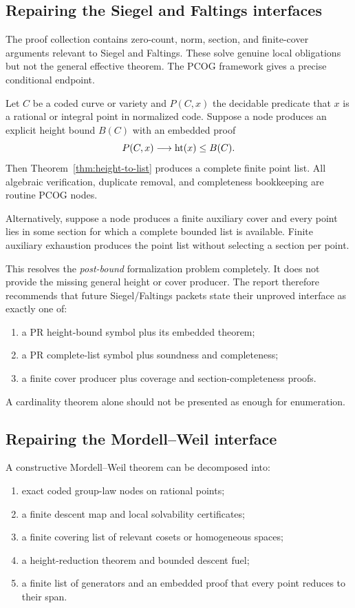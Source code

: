 \subsection{Repairing the Siegel and Faltings interfaces}

The proof collection contains zero-count, norm, section, and finite-cover
arguments relevant to Siegel and Faltings.  These solve genuine local
obligations but not the general effective theorem.  The PCOG framework gives a
precise conditional endpoint.

Let \(C\) be a coded curve or variety and \(P(C,x)\) the decidable predicate
that \(x\) is a rational or integral point in normalized code.  Suppose a node
produces an explicit height bound \(B(C)\) with an embedded proof
\[
 P(C,x)\longrightarrow \operatorname{ht}(x)\leq B(C).
\]
Then Theorem~\ref{thm:height-to-list} produces a complete finite point list.
All algebraic verification, duplicate removal, and completeness bookkeeping
are routine PCOG nodes.

Alternatively, suppose a node produces a finite auxiliary cover and every
point lies in some section for which a complete bounded list is available.
Finite auxiliary exhaustion produces the point list without selecting a
section per point.

This resolves the \emph{post-bound} formalization problem completely.  It does
not provide the missing general height or cover producer.  The report therefore
recommends that future Siegel/Faltings packets state their unproved interface
as exactly one of:

\begin{enumerate}
\item a PR height-bound symbol plus its embedded theorem;
\item a PR complete-list symbol plus soundness and completeness;
\item a finite cover producer plus coverage and section-completeness proofs.
\end{enumerate}

A cardinality theorem alone should not be presented as enough for enumeration.

\subsection{Repairing the Mordell--Weil interface}

A constructive Mordell--Weil theorem can be decomposed into:

\begin{enumerate}
\item exact coded group-law nodes on rational points;
\item a finite descent map and local solvability certificates;
\item a finite covering list of relevant cosets or homogeneous spaces;
\item a height-reduction theorem and bounded descent fuel;
\item a finite list of generators and an embedded proof that every point
reduces to their span.
\end{enumerate}

